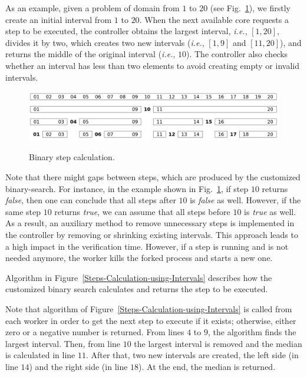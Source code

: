 \documentclass{doublecol-new}
\theoremstyle{TH}{
\newtheorem{lemma}{Lemma}
\newtheorem{theorem}[lemma]{Theorem}
\newtheorem{corrolary}[lemma]{Corrolary}
\newtheorem{conjecture}[lemma]{Conjecture}
\newtheorem{proposition}[lemma]{Proposition}
\newtheorem{claim}[lemma]{Claim}
\newtheorem{stheorem}[lemma]{Wrong Theorem}
\newtheorem{algorithm}{Algorithm}
}
\theoremstyle{THrm}{
\newtheorem{definition}{Definition}[section]
\newtheorem{question}{Question}[section]
\newtheorem{remark}{Remark}
\newtheorem{scheme}{Scheme}
}
\theoremstyle{THhit}{
\newtheorem{case}{Case}[section]
}
\begin{document}
\vspace{-5 mm}
As an example, given a problem of domain from $1$ to $20$ (see Fig.~\ref{Binary-Step-Calculation}), we firstly create an initial interval from $1$ to $20$. When the next available core requests a step to be executed, the controller obtains the largest interval, {\it i.e.}, $\left[1,20\right]$, divides it by two, which creates two new intervals ({\it i.e.}, $\left[1,9\right]$ and $\left[11,20\right]$), and returns the middle of the original interval ({\it i.e.}, $10$). The controller also checks whether an interval has less than two elements to avoid creating empty or invalid intervals.

\begin{figure}[h!]
	\caption{Binary step calculation.}
	\centering
	\includegraphics[scale=0.17]{figures/Fig4.png}	
	\label{Binary-Step-Calculation}
\end{figure}

\vspace{-4 mm}
Note that there might gaps between steps, which are produced by the customized binary-search. For instance, in the example shown in Fig.~\ref{Binary-Step-Calculation}, if step $10$ returns \textit{false}, then one can conclude that all steps after $10$ is \textit{false} as well. However, if the same step $10$ returns \textit{true}, we can assume that all steps before $10$ is \textit{true} as well. As a result, an auxiliary method to remove unnecessary steps is implemented in the controller by removing or shrinking existing intervals. This approach leads to a high impact in the verification time. However, if a step is running and is not needed anymore, the worker kills the forked process and starts a new one.

Algorithm in Figure~\ref{Steps-Calculation-using-Intervals} describes how the customized binary search calculates and returns the step to be executed. 

Note that algorithm of Figure~\ref{Steps-Calculation-using-Intervals} is called from each worker in order to get the next step to execute if it exists; otherwise, either zero or a negative number is returned.
From lines $4$ to $9$, the algorithm finds the largest interval. Then, from line $10$ the largest interval is removed and the median is calculated in line $11$. After that, two new intervals are created, the left side (in line $14$) and the right side (in line $18$). At the end, the median is returned.
\end{document}
